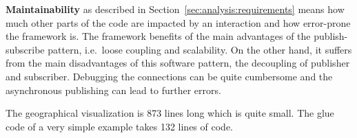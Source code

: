 \textbf{Maintainability} as described in Section~\ref{sec:analysis:requirements} means how much other parts of the code are impacted by an interaction and how error-prone the framework is.
The framework benefits of the main advantages of the publish-subscribe pattern, i.e.\ loose coupling and scalability.
On the other hand, it suffers from the main disadvantages of this software pattern, the decoupling of publisher and subscriber.
Debugging the connections can be quite cumbersome and the asynchronous publishing can lead to further errors.

The geographical visualization is 873 lines long which is quite small.
The glue code of a very simple example takes 132 lines of code.







